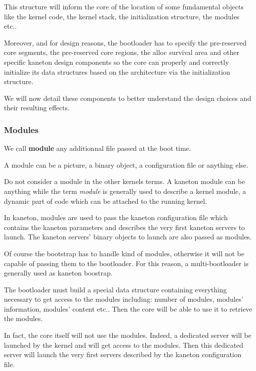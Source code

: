 This structure will inform the core of the location of some
fundamental objects like the kernel code, the kernel stack, the
initialization structure, the modules etc..

Moreover, and for design reasons, the bootloader has to specify the
pre-reserved core segments, the pre-reserved core regions, the alloc
survival area and other specific kaneton design components so the core
can properly and correctly initialize its data structures based on the
architecture via the initialization structure.

We will now detail these components to better understand the design
choices and their resulting effects.

%
%

\subsubsection{Modules}

We call \textbf{module} any additionnal file passed at the boot time.

A module can be a picture, a binary object, a configuration file
or anything else.

Do not consider a module in the other kernels terms. A kaneton module
can be anything while the term \textit{module} is generally used to describe
a kernel module, a dynamic part of code which can be attached to the
running kernel.

In kaneton, modules are used to pass the kaneton configuration file
which contains the kaneton parameters and describes the very first
kaneton servers to launch. The kaneton servers' binary objects to
launch are also passed as modules.

Of course the bootstrap has to handle kind of modules, otherwise it will
not be capable of passing them to the bootloader. For this reason,
a multi-bootloader is generally used as kaneton boostrap.

The bootloader must build a special data structure containing everything
necessary to get access to the modules including: number of modules,
modules' information, modules' content etc.. Then the core will be
able to use it to retrieve the modules.

In fact, the core itself will not use the modules. Indeed, a dedicated
server will be launched by the kernel and will get access to the modules.
Then this dedicated server will launch the very first servers described
by the kaneton configuration file.

